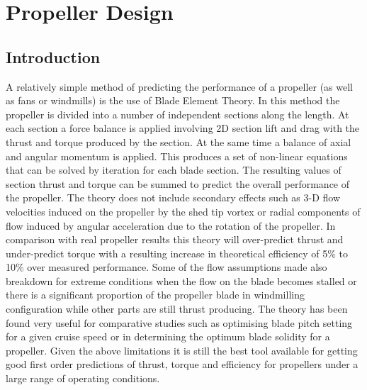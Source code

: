 \chapter{Propeller Design}
\section{Introduction}
A relatively simple method of predicting the performance of a propeller (as well as fans or windmills) is the use of Blade Element Theory. In this method the propeller is divided into a number of independent sections along the length. At each section a force balance is applied involving 2D section lift and drag with the thrust and torque produced by the section. At the same time a balance of axial and angular momentum is applied. This produces a set of non-linear equations that can be solved by iteration for each blade section. The resulting values of section thrust and torque can be summed to predict the overall performance of the propeller.
The theory does not include secondary effects such as 3-D flow velocities induced on the propeller by the shed tip vortex or radial components of flow induced by angular acceleration due to the rotation of the propeller. In comparison with real propeller results this theory will over-predict thrust and under-predict torque with a resulting increase in theoretical efficiency of 5\% to 10\% over measured performance. Some of the flow assumptions made also breakdown for extreme conditions when the flow on the blade becomes stalled or there is a significant proportion of the propeller blade in windmilling configuration while other parts are still thrust producing.
The theory has been found very useful for comparative studies such as optimising blade pitch setting for a given cruise speed or in determining the optimum blade solidity for a propeller. Given the above limitations it is still the best tool available for getting good first order predictions of thrust, torque and efficiency for propellers under a large range of operating conditions.

